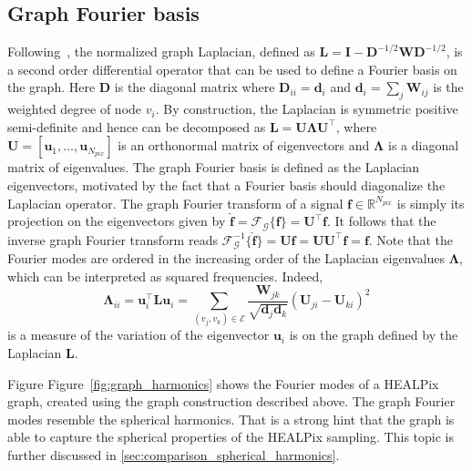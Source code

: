 \documentclass[final,twocolumn,3p,times,sort&compress]{elsarticle}
\newcommand{\figref}[1]{Figure~\ref{fig:#1}}
\renewcommand{\b}[1]{{\bm{#1}}}   %
\newcommand{\1}{\b{1}}              %
\newcommand{\0}{\b{0}}              %
\newcommand{\G}{\mathcal{G}}
\newcommand{\E}{\mathcal{E}}
\renewcommand{\L}{\b{L}}
\newcommand{\W}{\b{W}}
\newcommand{\I}{\b{I}}
\newcommand{\D}{\b{D}}
\newcommand{\U}{\b{U}}
\newcommand{\f}{\b{f}}
\newcommand{\trans}{^\intercal}
\newcommand{\R}{\mathbb{R}}
\newcommand{\bLambda}{\b{\Lambda}}
\begin{document}
\subsection{Graph Fourier basis}

Following~\cite{shuman2013emerging}, the normalized graph Laplacian,
defined as $\L = \I - \D^{-1/2} \W \D^{-1/2}$, is a second order differential operator
that can be used to define a Fourier basis on the graph. Here $\D$ is the diagonal
matrix where $\D_{ii} = \b{d}_i$ and $\b{d}_i = \sum_j \W_{ij}$ is the weighted degree of node $v_i$. By construction, the Laplacian is symmetric positive
semi-definite and hence can be decomposed as $\L = \U \bLambda \U\trans$, where $\U = [\b u_1, \ldots, \b u_{N_{pix}}]$ is an
orthonormal matrix of eigenvectors and $\bLambda$ is a diagonal matrix of
eigenvalues. The graph Fourier basis is defined as the Laplacian eigenvectors, motivated by the fact that a Fourier basis should diagonalize the Laplacian operator.
The graph Fourier transform of a signal $\f \in \R^{N_{pix}}$ is simply its projection on the eigenvectors given by
$\hat{\f} = \mathcal{F}_\G \{\f\} = \U\trans \f$. It follows that the inverse graph Fourier transform reads $\mathcal{F}^{-1}_\G \{\hat{\f}\} = \U\hat{\f} = \U \U\trans \f = \f$.
Note that the Fourier modes are ordered in the increasing order of the Laplacian eigenvalues $\bLambda$, which can be interpreted as squared frequencies.
Indeed,
\begin{equation*}
	\bLambda_{ii} = \b u_i\trans \L \b u_i = \sum_{(v_j, v_k) \in \E} \frac{\W_{jk}}{\sqrt{\b d_j \b d_k}} (\U_{ji} - \U_{ki})^2
\end{equation*}
is a measure of the variation of the eigenvector $\b u_i$ is on the graph defined by the Laplacian $\L$.


Figure \figref{graph_harmonics} shows the Fourier modes of a HEALPix graph, created using the graph construction described above.
The graph Fourier modes resemble the spherical harmonics.
That is a strong hint that the graph is able to capture the spherical properties of the HEALPix sampling.
This topic is further discussed in \ref{sec:comparison_spherical_harmonics}.
\end{document}
